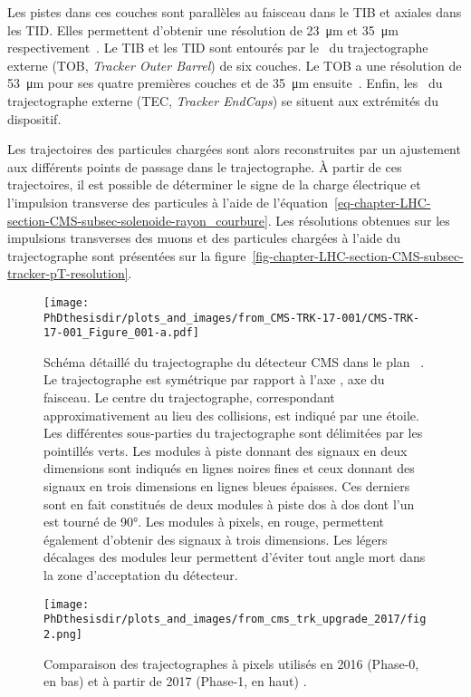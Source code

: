 Les pistes dans ces couches sont parallèles au faisceau dans le TIB et axiales dans les TID.
Elles permettent d'obtenir une résolution de \SI{23}{\micro\meter} et \SI{35}{\micro\meter} respectivement~\cite{cms_paper}.
Le TIB et les TID sont entourés par le \CMSbarrel\ du trajectographe externe (TOB, \emph{Tracker Outer Barrel}) de six couches.
Le TOB a une résolution de \SI{53}{\micro\meter} pour ses quatre premières couches et de \SI{35}{\micro\meter} ensuite~\cite{cms_paper}.
Enfin, les \CMSendcaps\ du trajectographe externe (TEC, \emph{Tracker EndCaps}) se situent aux extrémités du dispositif.
\par
Les trajectoires des particules chargées sont alors reconstruites par un ajustement aux différents points de passage dans le trajectographe.
À partir de ces trajectoires, il est possible de déterminer le signe de la charge électrique et l'impulsion transverse des particules à l'aide de l'équation~\eqref{eq-chapter-LHC-section-CMS-subsec-solenoide-rayon_courbure}.
Les résolutions obtenues sur les impulsions transverses des muons et des particules chargées à l'aide du trajectographe sont présentées sur la figure~\ref{fig-chapter-LHC-section-CMS-subsec-tracker-pT-resolution}.
\begin{figure}[h]
\centering
\texttt{[image: \\PhDthesisdir/plots\_and\_images/from\_CMS-TRK-17-001/CMS-TRK-17-001\_Figure\_001-a.pdf]}
\caption[Schéma détaillé du trajectographe du détecteur CMS.]{Schéma détaillé du trajectographe du détecteur CMS dans le plan ~\cite{CMS-TRK-11-001,CMS-TRK-17-001}. Le trajectographe est symétrique par rapport à l'axe , axe du faisceau. Le centre du trajectographe, correspondant approximativement au lieu des collisions, est indiqué par une étoile. Les différentes sous-parties du trajectographe sont délimitées par les pointillés verts. Les modules à piste donnant des signaux en deux dimensions sont indiqués en lignes noires fines et ceux donnant des signaux en trois dimensions en lignes bleues épaisses. Ces derniers sont en fait constitués de deux modules à piste dos à dos dont l'un est tourné de \ang{90}. Les modules à pixels, en rouge, permettent également d'obtenir des signaux à trois dimensions. Les légers décalages des modules leur permettent d'éviter tout angle mort dans la zone d'acceptation du détecteur.}
\label{fig-CMS-trk_detailed_scheme}
\end{figure}
\begin{figure}[h]
\centering
\texttt{[image: \\PhDthesisdir/plots\_and\_images/from\_cms\_trk\_upgrade\_2017/fig2.png]}
\caption[Comparaison des trajectographes à pixels utilisés en 2016 et à partir de 2017.]{Comparaison des trajectographes à pixels utilisés en 2016 (Phase-0, en bas) et à partir de 2017 (Phase-1, en haut) \cite{CMS-TDR-11,cms_trk_upgrade_2017}.}
\label{fig-chapter-LHC-section-CMS-subsec-tracker-2017-upgrade}
\end{figure}
